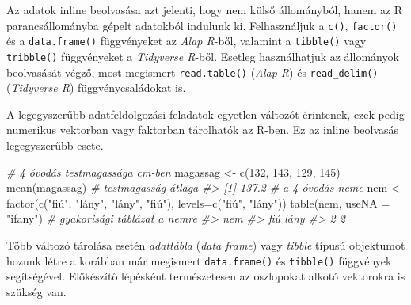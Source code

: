 \documentclass[
]{book}
\newenvironment{Shaded}{\begin{snugshade}}{\end{snugshade}}
\newcommand{\AttributeTok}[1]{\textcolor[rgb]{0.77,0.63,0.00}{#1}}
\newcommand{\CommentTok}[1]{\textcolor[rgb]{0.56,0.35,0.01}{\textit{#1}}}
\newcommand{\DecValTok}[1]{\textcolor[rgb]{0.00,0.00,0.81}{#1}}
\newcommand{\FunctionTok}[1]{\textcolor[rgb]{0.00,0.00,0.00}{#1}}
\newcommand{\NormalTok}[1]{#1}
\newcommand{\OtherTok}[1]{\textcolor[rgb]{0.56,0.35,0.01}{#1}}
\newcommand{\StringTok}[1]{\textcolor[rgb]{0.31,0.60,0.02}{#1}}
\begin{document}
Az adatok inline beolvasása azt jelenti, hogy nem külső állományból, hanem az R parancsállományba gépelt adatokból indulunk ki. Felhasználjuk a \texttt{c()}, \texttt{factor()} és a \texttt{data.frame()} függvényeket az \emph{Alap R}-ből, valamint a \texttt{tibble()} vagy \texttt{tribble()} függvényeket a \emph{Tidyverse R}-ből. Esetleg használhatjuk az állományok beolvasását végző, most megismert \texttt{read.table()} (\emph{Alap R}) és \texttt{read\_delim()} (\emph{Tidyverse R}) függvénycsaládokat is.

A legegyszerűbb adatfeldolgozási feladatok egyetlen változót érintenek, ezek pedig numerikus vektorban vagy faktorban tárolhatók az R-ben. Ez az inline beolvasás legegyszerűbb esete.

\begin{Shaded}
\begin{Highlighting}[]
\CommentTok{\# 4 óvodás testmagassága cm{-}ben}
\NormalTok{magassag }\OtherTok{\textless{}{-}} \FunctionTok{c}\NormalTok{(}\DecValTok{132}\NormalTok{, }\DecValTok{143}\NormalTok{, }\DecValTok{129}\NormalTok{, }\DecValTok{145}\NormalTok{)}
\FunctionTok{mean}\NormalTok{(magassag)  }\CommentTok{\# testmagasság átlaga}
\CommentTok{\#\textgreater{} [1] 137.2}
\CommentTok{\# a 4 óvodás neme}
\NormalTok{nem }\OtherTok{\textless{}{-}} \FunctionTok{factor}\NormalTok{(}\FunctionTok{c}\NormalTok{(}\StringTok{"fiú"}\NormalTok{, }\StringTok{"lány"}\NormalTok{, }\StringTok{"lány"}\NormalTok{, }\StringTok{"fiú"}\NormalTok{), }\AttributeTok{levels=}\FunctionTok{c}\NormalTok{(}\StringTok{"fiú"}\NormalTok{, }\StringTok{"lány"}\NormalTok{)) }
\FunctionTok{table}\NormalTok{(nem, }\AttributeTok{useNA =} \StringTok{"ifany"}\NormalTok{)  }\CommentTok{\# gyakorisági táblázat a nemre}
\CommentTok{\#\textgreater{} nem}
\CommentTok{\#\textgreater{}  fiú lány }
\CommentTok{\#\textgreater{}    2    2}
\end{Highlighting}
\end{Shaded}

Több változó tárolása esetén \emph{adattábla} (\emph{data frame}) vagy \emph{tibble} típusú objektumot hozunk létre a korábban már megismert \texttt{data.frame()} és \texttt{tibble()} függvények segítségével. Előkészítő lépésként természetesen az oszlopokat alkotó vektorokra is szükség van.
\end{document}
